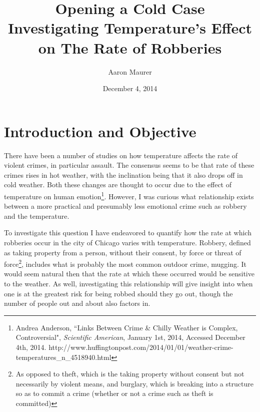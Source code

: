\documentclass[11pt]{article}
\title{Opening a Cold Case \\ {\large Investigating Temperature's Effect on The Rate of Robberies}}
\date{December 4, 2014}
\author{Aaron Maurer}
\theoremstyle{definition}
\begin{document}
\maketitle

\section{Introduction and Objective} 

There have been a number of studies on how temperature affects the rate of violent crimes, in particular assault. The consensus seems to be that rate of these crimes rises in hot weather, with the inclination being that it also drops off in cold weather. Both these changes are thought to occur due to the effect of temperature on human emotion\footnote{Andrea Anderson, ``Links Between Crime \& Chilly Weather is Complex, Controversial", \textit{Scientific American}, January 1st, 2014, Accessed December 4th, 2014. http://www.huffingtonpost.com/2014/01/01/weather-crime-temperatures\_n\_4518940.html}. However, I was curious what relationship exists between a more practical and presumably less emotional crime such as robbery and the temperature. \par

To investigate this question I have endeavored to quantify how the rate at which robberies occur in the city of Chicago varies with temperature. Robbery, defined as taking property from a person, without their consent, by force or threat of force\footnote{As opposed to theft, which is the taking property without consent but not necessarily by violent means, and burglary, which is breaking into a structure so as to commit a crime (whether or not a crime such as theft is committed)}, includes what is probably the most common outdoor crime, mugging. It would seem natural then that the rate at which these occurred would be sensitive to the weather. As well, investigating this relationship will give insight into when one is at the greatest risk for being robbed should they go out, though the number of people out and about also factors in.
\par
\end{document}
